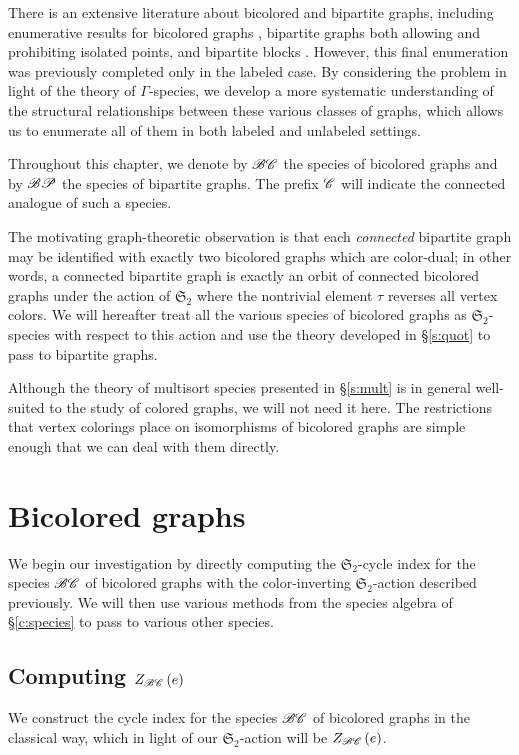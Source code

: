 \documentclass[sectionflow,singlespace,twoside]{brandiss} %
\numberwithin{section}{chapter}
\numberwithin{figure}{chapter}
\begin{document}
There is an extensive literature about bicolored and bipartite graphs, including enumerative results for bicolored graphs \cite{har:bicolored}, bipartite graphs both allowing \cite{han:bipartite} and prohibiting \cite{harprins:bipartite} isolated points, and bipartite blocks \cite{harrob:bipblocks}.
However, this final enumeration was previously completed only in the labeled case.
By considering the problem in light of the theory of $\Gamma$-species, we develop a more systematic understanding of the structural relationships between these various classes of graphs, which allows us to enumerate all of them in both labeled and unlabeled settings.

Throughout this chapter, we denote by $\mathscr{BC}$ the species of bicolored graphs and by $\mathscr{BP}$ the species of bipartite graphs.
The prefix $\mathscr{C}$ will indicate the connected analogue of such a species.

The motivating graph-theoretic observation is that each \emph{connected} bipartite graph may be identified with exactly two bicolored graphs which are color-dual; in other words, a connected bipartite graph is exactly an orbit of connected bicolored graphs under the action of $\mathfrak{S}_{2}$ where the nontrivial element $\tau$ reverses all vertex colors.
We will hereafter treat all the various species of bicolored graphs as $\mathfrak{S}_{2}$-species with respect to this action and use the theory developed in \S \ref{s:quot} to pass to bipartite graphs.

Although the theory of multisort species presented in \S \ref{s:mult} is in general well-suited to the study of colored graphs, we will not need it here.
The restrictions that vertex colorings place on isomorphisms of bicolored graphs are simple enough that we can deal with them directly.

\section{Bicolored graphs}\label{s:bcgraph}
We begin our investigation by directly computing the $\mathfrak{S}_{2}$-cycle index for the species $\mathscr{BC}$ of bicolored graphs with the color-inverting $\mathfrak{S}_{2}$-action described previously.
We will then use various methods from the species algebra of \S \ref{c:species} to pass to various other species.

\subsection{Computing $Z_{\mathscr{BC}} \left( {e} \right)$}\label{ss:ecibc}
We construct the cycle index for the species $\mathscr{BC}$ of bicolored graphs in the classical way, which in light of our $\mathfrak{S}_{2}$-action will be $Z_{\mathscr{BC}} \left( {e} \right)$. 
\end{document}
